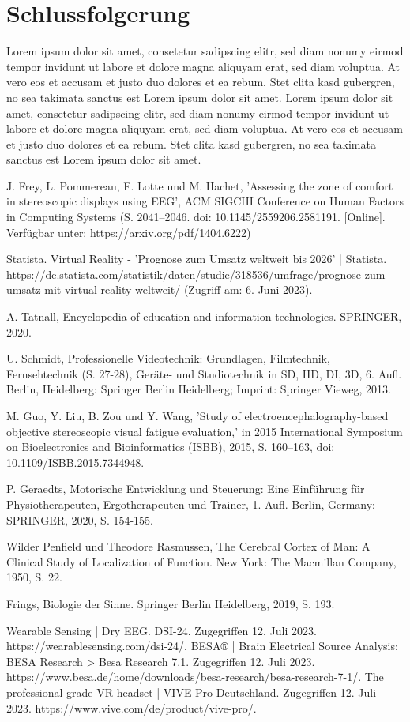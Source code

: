 \documentclass[conference]{IEEEtran}
\begin{document}
\section{Schlussfolgerung}
Lorem ipsum dolor sit amet, consetetur sadipscing elitr, sed diam nonumy eirmod tempor invidunt ut labore et dolore magna aliquyam erat, sed diam voluptua. At vero eos et accusam et justo duo dolores et ea rebum. Stet clita kasd gubergren, no sea takimata sanctus est Lorem ipsum dolor sit amet. Lorem ipsum dolor sit amet, consetetur sadipscing elitr, sed diam nonumy eirmod tempor invidunt ut labore et dolore magna aliquyam erat, sed diam voluptua. At vero eos et accusam et justo duo dolores et ea rebum. Stet clita kasd gubergren, no sea takimata sanctus est Lorem ipsum dolor sit amet.

\begin{thebibliography}{00}
 J. Frey, L. Pommereau, F. Lotte und M. Hachet, 'Assessing the zone of comfort in stereoscopic displays using EEG', ACM SIGCHI Conference on Human Factors in Computing Systems (S. 2041–2046. doi: 10.1145/2559206.2581191. [Online]. Verfügbar unter: https://arxiv.org/pdf/1404.6222)

 Statista. Virtual Reality - 'Prognose zum Umsatz weltweit bis 2026' | Statista. https://de.statista.com/statistik/daten/studie/318536/umfrage/prognose-zum-umsatz-mit-virtual-reality-weltweit/ (Zugriff am: 6. Juni 2023).

 A. Tatnall, Encyclopedia of education and information technologies. SPRINGER, 2020.

 U. Schmidt, Professionelle Videotechnik: Grundlagen, Filmtechnik, Fernsehtechnik (S. 27-28), Geräte- und Studiotechnik in SD, HD, DI, 3D, 6. Aufl. Berlin, Heidelberg: Springer Berlin Heidelberg; Imprint: Springer Vieweg, 2013.

 M. Guo, Y. Liu, B. Zou und Y. Wang, 'Study of electroencephalography-based objective stereoscopic visual fatigue evaluation,' in 2015 International Symposium on Bioelectronics and Bioinformatics (ISBB), 2015, S. 160–163, doi: 10.1109/ISBB.2015.7344948.

 P. Geraedts, Motorische Entwicklung und Steuerung: Eine Einführung für Physiotherapeuten, Ergotherapeuten und Trainer, 1. Aufl. Berlin, Germany: SPRINGER, 2020, S. 154-155.

 Wilder Penfield und Theodore Rasmussen, The Cerebral Cortex of Man: A Clinical Study of Localization of Function. New York: The Macmillan Company, 1950, S. 22.

 Frings, Biologie der Sinne. Springer Berlin Heidelberg, 2019, S. 193.

Wearable Sensing | Dry EEG. DSI-24. Zugegriffen 12. Juli 2023. https://wearablesensing.com/dsi-24/.
BESA® | Brain Electrical Source Analysis: BESA Research > Besa Research 7.1. Zugegriffen 12. Juli 2023. https://www.besa.de/home/downloads/besa-research/besa-research-7-1/.
The professional-grade VR headset | VIVE Pro Deutschland. Zugegriffen 12. Juli 2023. https://www.vive.com/de/product/vive-pro/.


\end{thebibliography}
\end{document}
